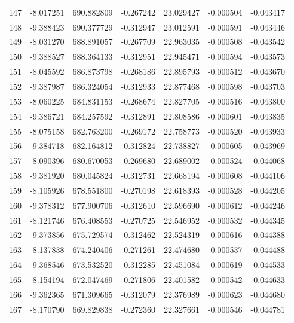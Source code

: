 \begin{tabular}{rrrrrrr}
 147 &  -8.017251 &  690.882809 & -0.267242 &  23.029427 &  -0.000504 & -0.043417 \\
 148 &  -9.388423 &  690.377729 & -0.312947 &  23.012591 &  -0.000591 & -0.043446 \\
 149 &  -8.031270 &  688.891057 & -0.267709 &  22.963035 &  -0.000508 & -0.043542 \\
 150 &  -9.388527 &  688.364133 & -0.312951 &  22.945471 &  -0.000594 & -0.043573 \\
 151 &  -8.045592 &  686.873798 & -0.268186 &  22.895793 &  -0.000512 & -0.043670 \\
 152 &  -9.387987 &  686.324054 & -0.312933 &  22.877468 &  -0.000598 & -0.043703 \\
 153 &  -8.060225 &  684.831153 & -0.268674 &  22.827705 &  -0.000516 & -0.043800 \\
 154 &  -9.386721 &  684.257592 & -0.312891 &  22.808586 &  -0.000601 & -0.043835 \\
 155 &  -8.075158 &  682.763200 & -0.269172 &  22.758773 &  -0.000520 & -0.043933 \\
 156 &  -9.384718 &  682.164812 & -0.312824 &  22.738827 &  -0.000605 & -0.043969 \\
 157 &  -8.090396 &  680.670053 & -0.269680 &  22.689002 &  -0.000524 & -0.044068 \\
 158 &  -9.381920 &  680.045824 & -0.312731 &  22.668194 &  -0.000608 & -0.044106 \\
 159 &  -8.105926 &  678.551800 & -0.270198 &  22.618393 &  -0.000528 & -0.044205 \\
 160 &  -9.378312 &  677.900706 & -0.312610 &  22.596690 &  -0.000612 & -0.044246 \\
 161 &  -8.121746 &  676.408553 & -0.270725 &  22.546952 &  -0.000532 & -0.044345 \\
 162 &  -9.373856 &  675.729574 & -0.312462 &  22.524319 &  -0.000616 & -0.044388 \\
 163 &  -8.137838 &  674.240406 & -0.271261 &  22.474680 &  -0.000537 & -0.044488 \\
 164 &  -9.368546 &  673.532520 & -0.312285 &  22.451084 &  -0.000619 & -0.044533 \\
 165 &  -8.154194 &  672.047469 & -0.271806 &  22.401582 &  -0.000542 & -0.044633 \\
 166 &  -9.362365 &  671.309665 & -0.312079 &  22.376989 &  -0.000623 & -0.044680 \\
 167 &  -8.170790 &  669.829838 & -0.272360 &  22.327661 &  -0.000546 & -0.044781 \\

\end{tabular}
